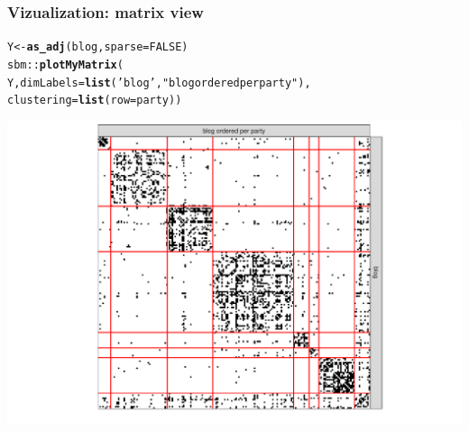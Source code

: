 \documentclass{beamer}\usepackage[]{graphicx}\usepackage[]{color}
\makeatletter
\newcommand{\hlnum}[1]{\textcolor[rgb]{0.686,0.059,0.569}{#1}}%
\newcommand{\hlstr}[1]{\textcolor[rgb]{0.192,0.494,0.8}{#1}}%
\newcommand{\hlopt}[1]{\textcolor[rgb]{0,0,0}{#1}}%
\newcommand{\hlstd}[1]{\textcolor[rgb]{0.345,0.345,0.345}{#1}}%
\newcommand{\hlkwb}[1]{\textcolor[rgb]{0.69,0.353,0.396}{#1}}%
\newcommand{\hlkwc}[1]{\textcolor[rgb]{0.333,0.667,0.333}{#1}}%
\newcommand{\hlkwd}[1]{\textcolor[rgb]{0.737,0.353,0.396}{\textbf{#1}}}%
\newenvironment{kframe}{%
 \def\at@end@of@kframe{}%
 \ifinner\ifhmode%
  \def\at@end@of@kframe{\end{minipage}}%
  \begin{minipage}{\columnwidth}%
 \fi\fi%
 \def\FrameCommand##1{\hskip\@totalleftmargin \hskip-\fboxsep
 \colorbox{shadecolor}{##1}\hskip-\fboxsep
     \hskip-\linewidth \hskip-\@totalleftmargin \hskip\columnwidth}%
 \MakeFramed {\advance\hsize-\width
   \@totalleftmargin\z@ \linewidth\hsize
   \@setminipage}}%
 {\par\unskip\endMakeFramed%
 \at@end@of@kframe}
\newenvironment{knitrout}{}{} %
\makeatother
\begin{document}
\begin{frame}[fragile]
  \frametitle{Vizualization: matrix view}

\begin{knitrout}\scriptsize
{}\color{fgcolor}\begin{kframe}
\begin{alltt}
\hlstd{Y}  \hlkwb{<-} \hlkwd{as_adj}\hlstd{(blog,} \hlkwc{sparse} \hlstd{=} \hlnum{FALSE}\hlstd{)}
\hlstd{sbm}\hlopt{::}\hlkwd{plotMyMatrix}\hlstd{(}
  \hlstd{Y,} \hlkwc{dimLabels} \hlstd{=} \hlkwd{list}\hlstd{(}\hlstr{'blog'}\hlstd{,} \hlstr{"blog ordered per party"}\hlstd{),}
  \hlkwc{clustering} \hlstd{=} \hlkwd{list}\hlstd{(}\hlkwc{row} \hlstd{= party))}
\end{alltt}
\end{kframe}
\includegraphics[width=.8\textwidth]{figures/unnamed-chunk-1-1} 
\end{knitrout}

\end{frame}
\end{document}
